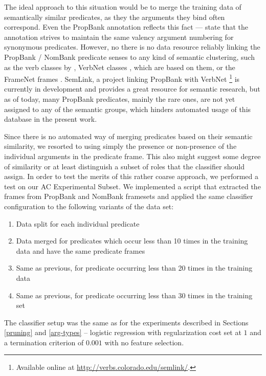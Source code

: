 \documentclass[12pt,notitlepage]{report}
\begin{document}
The ideal approach to this situation would be to merge the training data of semantically similar predicates, as they the arguments they bind often correspond. Even the PropBank annotation reflects this fact --- \citet{kingsbury02} state that the annotation strives to maintain the same valency argument numbering for synonymous predicates. However, no there is no data resource reliably linking the PropBank / NomBank predicate senses to any kind of semantic clustering, such as the verb classes by \citet{levin93}, VerbNet classes \citep{kipper-schuler05}, which are based on them, or the FrameNet frames \citep{baker98,baker02}. SemLink, a project linking PropBank with VerbNet \citep{loper07}\footnote{Available online at \url{http://verbs.colorado.edu/semlink/}.} is currently in development and provides a great resource for semantic research, but as of today, many PropBank predicates, mainly the rare ones, are not yet assigned to any of the semantic groups, which hinders automated usage of this database in the present work.

Since there is no automated way of merging predicates based on their semantic similarity, we resorted to using simply the presence or non-presence of the individual arguments in the predicate frame. This also might suggest some degree of similarity or at least distinguish a subset of roles that the classifier should assign. In order to test the merits of this rather coarse approach, we performed a test on our AC Experimental Subset. We implemented a script that extracted the frames from PropBank and NomBank framesets and applied the same classifier configuration to the following variants of the data set:
\begin{enumerate}
    \item Data split for each individual predicate
    \item Data merged for predicates which occur less than 10 times in the training data and have the same predicate frames
    \item Same as previous, for predicate occurring less than 20 times in the training data 
    \item Same as previous, for predicate occurring less than 30 times in the training set
\end{enumerate}
The classifier setup was the same as for the experiments described in Sections \ref{pruning} and \ref{arg-types} -- logistic regression with regularization cost set at $1$ and a termination criterion of $0.001$ with no feature selection.
\end{document}
